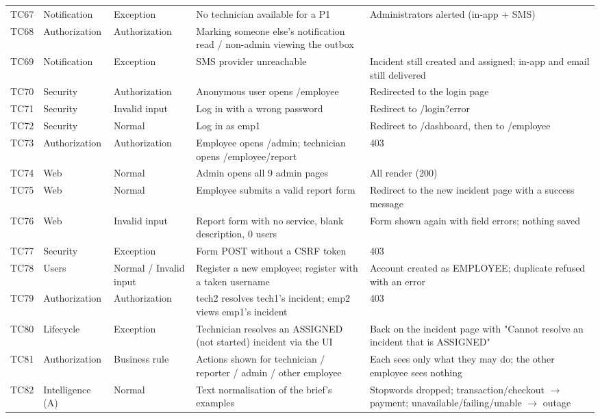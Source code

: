 \begin{longtable}{@{}L{1.0cm}L{1.85cm}L{2.15cm}L{4.05cm}L{5.45cm}@{}}
TC67 & Notification & Exception & No technician available for a P1 & Administrators alerted (in-app + SMS) \\
TC68 & Authorization & Authorization & Marking someone else's notification read / non-admin viewing the outbox &  \\
TC69 & Notification & Exception & SMS provider unreachable & Incident still created and assigned; in-app and email still delivered \\
TC70 & Security & Authorization & Anonymous user opens /employee & Redirected to the login page \\
TC71 & Security & Invalid input & Log in with a wrong password & Redirect to /login?error \\
TC72 & Security & Normal & Log in as emp1 & Redirect to /dashboard, then to /employee \\
TC73 & Authorization & Authorization & Employee opens /admin; technician opens /employee/report & 403 \\
TC74 & Web & Normal & Admin opens all 9 admin pages & All render (200) \\
TC75 & Web & Normal & Employee submits a valid report form & Redirect to the new incident page with a success message \\
TC76 & Web & Invalid input & Report form with no service, blank description, 0 users & Form shown again with field errors; nothing saved \\
TC77 & Security & Exception & Form POST without a CSRF token & 403 \\
TC78 & Users & Normal / Invalid input & Register a new employee; register with a taken username & Account created as EMPLOYEE; duplicate refused with an error \\
TC79 & Authorization & Authorization & tech2 resolves tech1's incident; emp2 views emp1's incident & 403 \\
TC80 & Lifecycle & Exception & Technician resolves an ASSIGNED (not started) incident via the UI & Back on the incident page with "Cannot resolve an incident that is ASSIGNED" \\
TC81 & Authorization & Business rule & Actions shown for technician / reporter / admin / other employee & Each sees only what they may do; the other employee sees nothing \\
TC82 & Intelligence (A) & Normal & Text normalisation of the brief's examples & Stopwords dropped; transaction/checkout $\rightarrow$ payment; unavailable/failing/unable $\rightarrow$ outage \\

\end{longtable}

